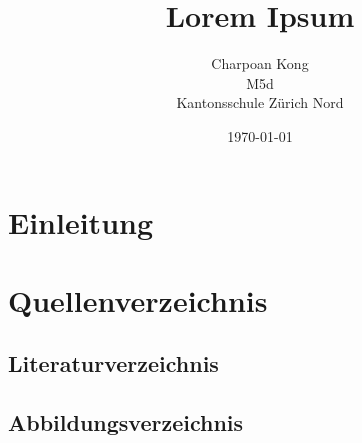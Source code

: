 \documentclass[12pt,a4paper, ngerman]{article}
\begin{document}
\title{Lorem Ipsum}
\date{\today}
\author{Charpoan Kong \\ M5d \\ Kantonsschule Zürich Nord}
\maketitle
{}

\newpage
\clearpage
{}
\tableofcontents
\newpage
{}

\section{Einleitung}


\newpage
\section{Quellenverzeichnis}
\subsection{Literaturverzeichnis}
\subsection{Abbildungsverzeichnis}
\end{document}
